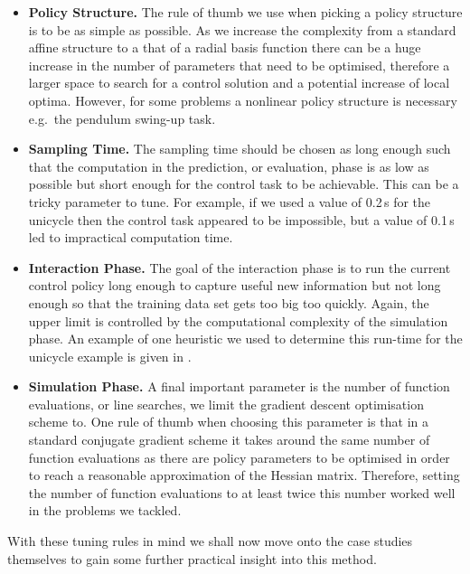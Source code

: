 \begin{itemize}
\item
{\bf Policy Structure.}
The rule of thumb we use when picking a policy structure is to be as simple as possible. As we increase the complexity from a standard affine structure to a that of a radial basis function there can be a huge increase in the number of parameters that need to be optimised, therefore a larger space to search for a control solution and a potential increase of local optima. However, for some problems a nonlinear policy structure is necessary e.g.\ the pendulum swing-up task.
\item
{\bf Sampling Time.} The sampling time should be chosen as long enough such that the computation in the prediction, or evaluation, phase is as low as possible but short enough for the control task to be achievable. This can be a tricky parameter to tune. For example, if we used a value of 0.2$\,$s for the unicycle then the control task appeared to be impossible, but a value of 0.1$\,$s led to impractical computation time.
\item
{\bf Interaction Phase.}
The goal of the interaction phase is to run the current control policy long enough to capture useful new information but not long enough so that the training data set gets too big too quickly. Again, the upper limit is controlled by the computational complexity of the simulation phase. An example of one heuristic we used to determine this run-time for the unicycle example is given in .
\item
{\bf Simulation Phase.}
A final important parameter is the number of function evaluations, or line searches, we limit the gradient descent optimisation scheme to. One rule of thumb when choosing this parameter is that in a standard conjugate gradient scheme it takes around the same number of function evaluations as there are policy parameters to be optimised in order to reach a reasonable approximation of the Hessian matrix. Therefore, setting the number of function evaluations to at least twice this number worked well in the problems we tackled.
\end{itemize}

With these tuning rules in mind we shall now move onto the case studies themselves to gain some further practical insight into this method.



